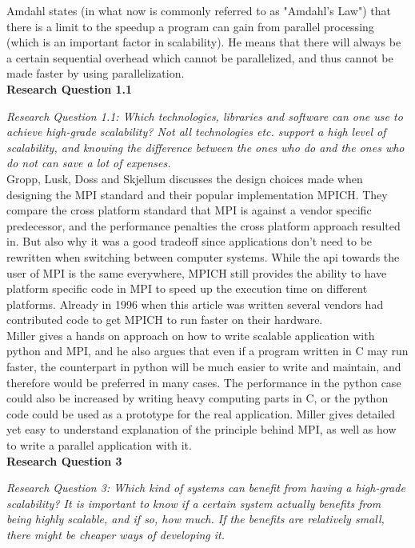 \documentclass{article}
\begin{document}
Amdahl \cite{amdahl1967validity} states (in what now is commonly referred to as
"Amdahl's Law") that there is a limit to the speedup a program can gain from
parallel processing (which is an important factor in scalability).  He means
that there will always be a certain sequential overhead which cannot be
parallelized, and thus cannot be made faster by using parallelization.
\\

\noindent\textbf{Research Question 1.1}

{\scriptsize \emph{Research Question 1.1: Which technologies, libraries and
software can one use to achieve high-grade scalability? Not all technologies
etc. support a high level of scalability, and knowing the difference between
the ones who do and the ones who do not can save a lot of expenses.}}
\\

Gropp, Lusk, Doss and Skjellum\cite{gropp1996high} discusses the design choices made when
designing the MPI standard and their popular implementation MPICH. They
compare the cross platform standard that MPI is against a vendor specific
predecessor, and the performance penalties the cross platform approach resulted
in. But also why it was a good tradeoff since applications don't need to be
rewritten when switching between computer systems. While the api towards
the user of MPI is the same everywhere, MPICH still provides the ability to
have platform specific code in MPI to speed up the execution time on different
platforms. Already in 1996 when this article was written several vendors
had contributed code to get MPICH to run faster on their hardware.
\\

Miller \cite{millerparallel}\cite{miller2002pympi} gives a hands on approach on
how to write scalable application with python and MPI, and he also argues that
even if a program written in C may run faster, the counterpart in python will
be much easier to write and maintain, and therefore would be preferred in many
cases. The performance in the python case could also be increased by
writing heavy computing parts in C, or the python code could be used as a 
prototype for the real application. Miller gives detailed yet easy to 
understand explanation of the principle behind MPI, as well as how to write a
parallel application with it.
\\

\noindent\textbf{Research Question 3}

{\scriptsize \emph{Research Question 3: Which kind of systems can benefit from
having a high-grade scalability? It is important to know if a certain system
actually benefits from being highly scalable, and if so, how much. If the
benefits are relatively small, there might be cheaper ways of developing it.}}
\\
\end{document}
